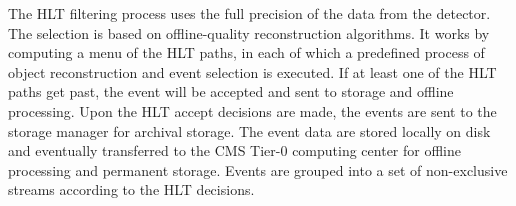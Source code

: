 The HLT filtering process uses the full precision of the data from the detector. The selection is based on offline-quality reconstruction algorithms. It works by computing a menu of the HLT paths, in each of which a predefined process of object reconstruction and event selection is executed. If at least one of the HLT paths get past, the event will be accepted and sent to storage and offline processing. Upon the HLT accept decisions are made, the events are sent to the storage manager for archival storage. The event data are stored locally on disk and eventually transferred to the CMS Tier-0 computing center for offline processing and permanent storage. Events are grouped into a set of non-exclusive streams according to the HLT decisions.

